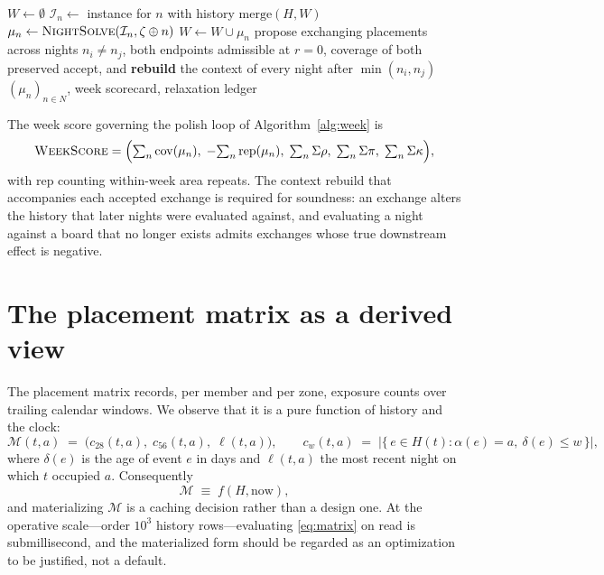 \documentclass[11pt,a4paper]{article}
\theoremstyle{definition}
\theoremstyle{remark}
\newcommand{\nightsolve}{\textsc{NightSolve}}
\newcommand{\weeksolve}{\textsc{WeekSolve}}
\begin{document}
\begin{algorithm}[htbp]
\caption{$\weeksolve(N, \mathcal{I}, \zeta)$ for nights $N = (n_1, \dots,
n_7)$}
\label{alg:week}
\begin{algorithmic}[1]
\State $W \gets \emptyset$
  \State $\mathcal{I}_n \gets$ instance for $n$ with history
         $\mathrm{merge}(H, W)$
  \State $\mu_n \gets \nightsolve(\mathcal{I}_n, \zeta \oplus n)$
  \State $W \gets W \cup \mu_n$
\EndFor
{}
  \State propose exchanging placements across nights $n_i \neq n_j$, both
         endpoints admissible at $r = 0$, coverage of both preserved
    \State accept, and \textbf{rebuild} the context of every night after
           $\min(n_i, n_j)$
  \EndIf
\EndFor
\State \Return $(\mu_n)_{n \in N}$, week scorecard, relaxation ledger
\end{algorithmic}
\end{algorithm}

\noindent
The week score governing the polish loop of Algorithm~\ref{alg:week} is
\begin{equation}
\textsc{WeekScore} = \Bigl(\textstyle\sum_n \mathrm{cov}(\mu_n),\;
-\!\sum_n \mathrm{rep}(\mu_n),\;
\sum_n \Sigma\rho,\; \sum_n \Sigma\pi,\; \sum_n \Sigma\kappa \Bigr),
\end{equation}
with $\mathrm{rep}$ counting within-week area repeats. The context rebuild
that accompanies each accepted exchange is required for soundness: an
exchange alters the history that later nights were evaluated against, and
evaluating a night against a board that no longer exists admits exchanges
whose true downstream effect is negative.

\section{The placement matrix as a derived view}
\label{sec:matrix}

The placement matrix records, per member and per zone, exposure counts over
trailing calendar windows. We observe that it is a pure function of history
and the clock:
\begin{equation}
\label{eq:matrix}
\mathcal{M}(t, a) \;=\; \bigl( c_{28}(t,a),\; c_{56}(t,a),\; \ell(t,a)
\bigr),
\qquad
c_{w}(t,a) \;=\;
\bigl\lvert \{\, e \in H(t) : \alpha(e) = a,\ \delta(e) \leq w \,\}
\bigr\rvert,
\end{equation}
where $\delta(e)$ is the age of event $e$ in days and $\ell(t,a)$ the most
recent night on which $t$ occupied $a$. Consequently
\begin{equation}
\mathcal{M} \;\equiv\; f(H, \mathrm{now}),
\end{equation}
and materializing $\mathcal{M}$ is a caching decision rather than a design
one. At the operative scale---order $10^3$ history rows---evaluating
\eqref{eq:matrix} on read is submillisecond, and the materialized form
should be regarded as an optimization to be justified, not a default.
\end{document}
